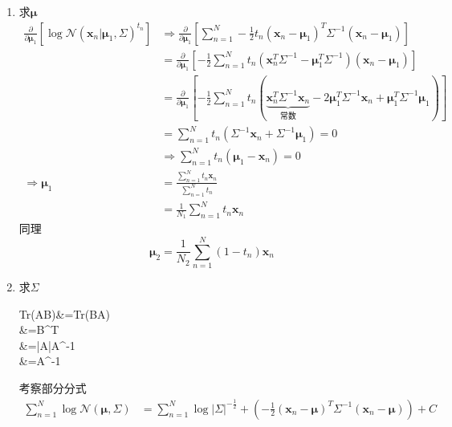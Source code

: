 \begin{enumerate}
	\item 求$\boldsymbol{\mu}$
	\begin{equation}
		\begin{aligned}
		\frac{\partial }{\partial \boldsymbol{\mu}_1}\left[\log \mathcal{N}(\boldsymbol{x}_n|\boldsymbol{\mu}_1,\Sigma)^{t_n}\right]&\Rightarrow \frac{\partial }{\partial \boldsymbol{\mu}_1}\left[\sum_{n=1}^{N}-\frac{1}{2}t_n(\boldsymbol{x}_n-\boldsymbol{\mu}_1)^T\Sigma^{-1}(\boldsymbol{x}_n-\boldsymbol{\mu}_1) \right]\\
		&=\frac{\partial }{\partial \boldsymbol{\mu}_1}\left[-\frac{1}{2}\sum_{n=1}^{N}t_n(\boldsymbol{x}_n^T\Sigma^{-1}-\boldsymbol{\mu}_1^T\Sigma^{-1})(\boldsymbol{x}_n-\boldsymbol{\mu}_1) \right]\\
		&=\frac{\partial }{\partial \boldsymbol{\mu}_1}\left[-\frac{1}{2}\sum_{n=1}^{N}t_n(\underbrace{\boldsymbol{x}_n^T\Sigma^{-1}\boldsymbol{x}_n}_{\text{常数}} - 2\boldsymbol{\mu}_1^T\Sigma^{-1}\boldsymbol{x}_n+\boldsymbol{\mu}_1^T\Sigma^{-1}\boldsymbol{\mu}_1) \right]\\
		&=\sum_{n=1}^{N}t_n(\Sigma^{-1}\boldsymbol{x}_n+\Sigma^{-1}\boldsymbol{\mu}_1)=0\\
		&\Rightarrow\sum_{n=1}^{N}t_n(\boldsymbol{\mu}_1-\boldsymbol{x}_n)=0\\
		\Rightarrow \boldsymbol{\mu}_1&=\frac{\sum\limits_{n=1}^{N}t_n\boldsymbol{x}_n}{\sum\limits_{n=1}^{N}t_n}\\
		&=\frac{1}{N_1}\sum\limits_{n=1}^{N}t_n\boldsymbol{x}_n
		\end{aligned}
	\end{equation}
	同理
	\begin{equation}
		\boldsymbol{\mu}_2=\frac{1}{N_2}\sum_{n=1}^{N}(1-t_n)\boldsymbol{x}_n
	\end{equation}
	\item 求$\Sigma$
	\begin{theorem}{}{}
		\begin{flalign}
			Tr(AB)&=Tr(BA)\\
			&=B^T\\
			&=|A|A^{-1}\\
			&=A^{-1}
		\end{flalign}
	\end{theorem}
	考察部分分式
	\begin{equation}
		\begin{aligned}
			\sum_{n=1}^{N}\log \mathcal{N}(\boldsymbol{\mu},\Sigma)			&=\sum_{n=1}^{N}\log |\Sigma|^{-\frac{1}{2}}+(-\frac{1}{2}(\boldsymbol{x}_n-\boldsymbol{\mu})^T\Sigma^{-1}(\boldsymbol{x}_n-\boldsymbol{\mu}))+C\\

\end{aligned}
\end{equation}
\end{enumerate}
